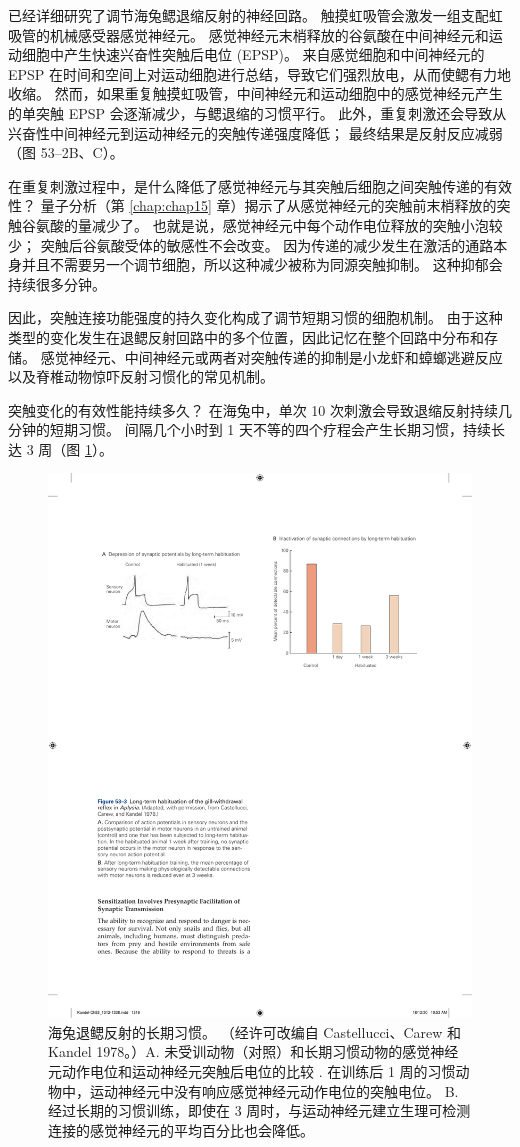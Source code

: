 已经详细研究了调节海兔鳃退缩反射的神经回路。 触摸虹吸管会激发一组支配虹吸管的机械感受器感觉神经元。 感觉神经元末梢释放的谷氨酸在中间神经元和运动细胞中产生快速兴奋性突触后电位 (EPSP)。 来自感觉细胞和中间神经元的 EPSP 在时间和空间上对运动细胞进行总结，导致它们强烈放电，从而使鳃有力地收缩。 然而，如果重复触摸虹吸管，中间神经元和运动细胞中的感觉神经元产生的单突触 EPSP 会逐渐减少，与鳃退缩的习惯平行。 此外，重复刺激还会导致从兴奋性中间神经元到运动神经元的突触传递强度降低； 最终结果是反射反应减弱（图 53–2B、C）。

在重复刺激过程中，是什么降低了感觉神经元与其突触后细胞之间突触传递的有效性？ 量子分析（第 \ref{chap:chap15} 章）揭示了从感觉神经元的突触前末梢释放的突触谷氨酸的量减少了。 也就是说，感觉神经元中每个动作电位释放的突触小泡较少； 突触后谷氨酸受体的敏感性不会改变。 因为传递的减少发生在激活的通路本身并且不需要另一个调节细胞，所以这种减少被称为同源突触抑制。 这种抑郁会持续很多分钟。

因此，突触连接功能强度的持久变化构成了调节短期习惯的细胞机制。 由于这种类型的变化发生在退鳃反射回路中的多个位置，因此记忆在整个回路中分布和存储。 感觉神经元、中间神经元或两者对突触传递的抑制是小龙虾和蟑螂逃避反应以及脊椎动物惊吓反射习惯化的常见机制。

突触变化的有效性能持续多久？ 在海兔中，单次 10 次刺激会导致退缩反射持续几分钟的短期习惯。 间隔几个小时到 1 天不等的四个疗程会产生长期习惯，持续长达 3 周（图 \ref{fig:53_3}）。

\begin{figure}[htbp]
	\centering
	\includegraphics[width=0.45\linewidth]{chap53/fig_53_3}
	\caption{海兔退鳃反射的长期习惯。 （经许可改编自 Castellucci、Carew 和 Kandel 1978。）A. 未受训动物（对照）和长期习惯动物的感觉神经元动作电位和运动神经元突触后电位的比较 . 在训练后 1 周的习惯动物中，运动神经元中没有响应感觉神经元动作电位的突触电位。 B. 经过长期的习惯训练，即使在 3 周时，与运动神经元建立生理可检测连接的感觉神经元的平均百分比也会降低。}
	\label{fig:53_3}
\end{figure}

